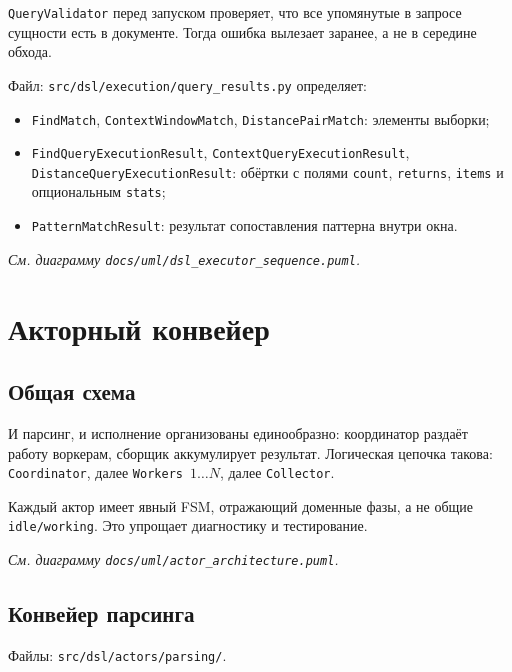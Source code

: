 \documentclass[12pt,a4paper]{article}
\newcommand{\uml}[1]{\textit{См. диаграмму \texttt{docs/uml/#1}.}}
\newcommand{\code}[1]{\texttt{#1}}
\begin{document}
\code{QueryValidator} перед запуском проверяет, что все упомянутые в
запросе сущности есть в документе. Тогда ошибка вылезает заранее,
а не в середине обхода.

Файл: \code{src/dsl/execution/query\_results.py} определяет:

\begin{itemize}
  \item \code{FindMatch}, \code{ContextWindowMatch},
        \code{DistancePairMatch}: элементы выборки;
  \item \code{FindQueryExecutionResult},
        \code{ContextQueryExecutionResult},
        \code{DistanceQueryExecutionResult}: обёртки с полями
        \code{count}, \code{returns}, \code{items} и опциональным
        \code{stats};
  \item \code{PatternMatchResult}: результат сопоставления
        паттерна внутри окна.
\end{itemize}

\uml{dsl\_executor\_sequence.puml}

\section{Акторный конвейер}

\subsection{Общая схема}

И парсинг, и исполнение организованы единообразно: координатор
раздаёт работу воркерам, сборщик аккумулирует результат. Логическая
цепочка такова: \code{Coordinator}, далее \code{Workers}~$1{\dots}N$,
далее \code{Collector}.

Каждый актор имеет явный FSM, отражающий доменные фазы, а не общие
\code{idle/working}. Это упрощает диагностику и тестирование.

\uml{actor\_architecture.puml}

\subsection{Конвейер парсинга}

Файлы: \code{src/dsl/actors/parsing/}.
\end{document}
